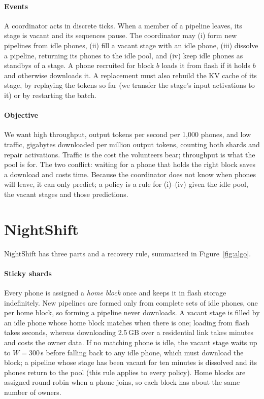 \documentclass[preprint,review,12pt,authoryear]{elsarticle}
\begin{document}
\paragraph{Events} A coordinator acts in discrete ticks. When a member of a
pipeline leaves, its stage is vacant and its sequences pause. The coordinator
may (i) form new pipelines from idle phones, (ii) fill a vacant stage with an
idle phone, (iii) dissolve a pipeline, returning its phones to the idle pool,
and (iv) keep idle phones as standbys of a stage. A phone recruited for block
$b$ loads it from flash if it holds $b$ and otherwise downloads it. A
replacement must also rebuild the KV cache of its stage, by replaying the
tokens so far (we transfer the stage's input activations to it) or by
restarting the batch.

\paragraph{Objective} We want high throughput, output tokens per second per
1,000 phones, and low traffic, gigabytes downloaded per million output tokens,
counting both shards and repair activations. Traffic is the cost the
volunteers bear; throughput is what the pool is for. The two conflict: waiting
for a phone that holds the right block saves a download and costs time.
Because the coordinator does not know when phones will leave, it can only
predict; a policy is a rule for (i)--(iv) given the idle pool, the vacant
stages and those predictions.

\section{NightShift}
\label{sec:design}

NightShift has three parts and a recovery rule, summarised in
Figure~\ref{fig:algo}.

\paragraph{Sticky shards} Every phone is assigned a \emph{home block} once and
keeps it in flash storage indefinitely. New pipelines are formed only from
complete sets of idle phones, one per home block, so forming a pipeline never
downloads. A vacant stage is filled by an idle phone whose home block matches
when there is one; loading from flash takes seconds, whereas downloading
2.5\,GB over a residential link takes minutes and costs the owner data. If no
matching phone is idle, the vacant stage waits up to $W=300$\,s before falling
back to any idle phone, which must download the block; a pipeline whose stage
has been vacant for ten minutes is dissolved and its phones return to the pool
(this rule applies to every policy). Home blocks are assigned round-robin when
a phone joins, so each block has about the same number of owners.
\end{document}
